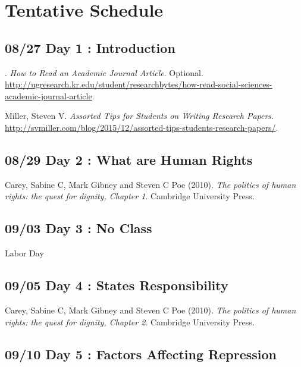 \documentclass[11pt,]{article}
\begin{document}
\hypertarget{tentative-schedule}{%
\section{Tentative Schedule}\label{tentative-schedule}}

\hypertarget{day-1-introduction}{%
\subsection{08/27 Day 1 : Introduction}\label{day-1-introduction}}

. \emph{How to Read an Academic Journal Article}. Optional.
\url{http://ugresearch.kr.edu/student/researchbytes/how-read-social-sciences-academic-journal-article}.

Miller, Steven V.
\emph{Assorted Tips for Students on Writing Research Papers}.
\url{http://svmiller.com/blog/2015/12/assorted-tips-students-research-papers/}.

\hypertarget{day-2-what-are-human-rights}{%
\subsection{08/29 Day 2 : What are Human
Rights}\label{day-2-what-are-human-rights}}

Carey, Sabine C, Mark Gibney and Steven C Poe (2010).
\emph{The politics of human rights: the quest for dignity, Chapter 1}.
Cambridge University Press.

\hypertarget{day-3-no-class}{%
\subsection{09/03 Day 3 : No Class}\label{day-3-no-class}}

Labor Day

\hypertarget{day-4-states-responsibility}{%
\subsection{09/05 Day 4 : States
Responsibility}\label{day-4-states-responsibility}}

Carey, Sabine C, Mark Gibney and Steven C Poe (2010).
\emph{The politics of human rights: the quest for dignity, Chapter 2}.
Cambridge University Press.

\hypertarget{day-5-factors-affecting-repression}{%
\subsection{09/10 Day 5 : Factors Affecting
Repression}\label{day-5-factors-affecting-repression}}
\end{document}
